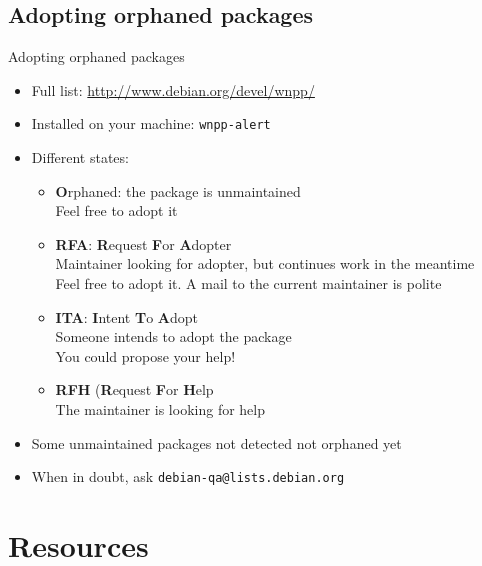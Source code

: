 \documentclass[10pt,final]{beamer}
\begin{document}
\subsection{Adopting orphaned packages}
\begin{frame}{Adopting orphaned packages}
\begin{itemize}
	\item Full list: \url{http://www.debian.org/devel/wnpp/}
	\item Installed on your machine: \texttt{wnpp-alert}
	\item Different states:
	\begin{itemize}
		\item \textbf{O}rphaned: the package is unmaintained\\
			Feel free to adopt it
		\item \textbf{RFA}: \textbf{R}equest \textbf{F}or \textbf{A}dopter\\
			Maintainer looking for adopter, but continues work in the meantime\\
			Feel free to adopt it. A mail to the current maintainer is polite
		\item \textbf{ITA}: \textbf{I}ntent \textbf{T}o \textbf{A}dopt\\
			Someone intends to adopt the package\\
			You could propose your help!
		\item \textbf{RFH} (\textbf{R}equest \textbf{F}or \textbf{H}elp\\
			The maintainer is looking for help
	\end{itemize}
	\item Some unmaintained packages not detected \arr not orphaned yet
	\item When in doubt, ask \texttt{debian-qa@lists.debian.org}
	\end{itemize}
\end{frame}


\section{Resources}
\end{document}
